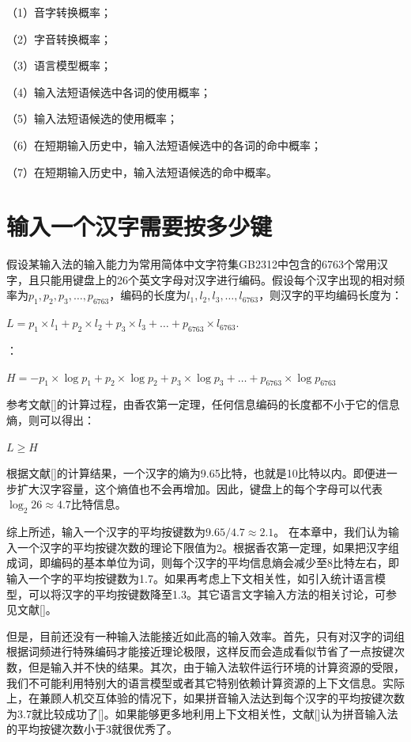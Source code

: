 （1）音字转换概率；

（2）字音转换概率；

（3）语言模型概率；

（4）输入法短语候选中各词的使用概率；

（5）输入法短语候选的使用概率；

（6）在短期输入历史中，输入法短语候选中的各词的命中概率；

（7）在短期输入历史中，输入法短语候选的命中概率。

\section{输入一个汉字需要按多少键}

假设某输入法的输入能力为常用简体中文字符集GB2312中包含的6763个常用汉字，且只能用键盘上的26个英文字母对汉字进行编码。假设每个汉字出现的相对频率为$p_1,p_2,p_3,\ldots,p_{6763}$，编码的长度为$l_1,l_2,l_3,\ldots,l_{6763}$，则汉字的平均编码长度为：

$L = p_1 \times l_1 + p_2 \times l_2 + p_3 \times l_3 + \ldots + p_{6763} \times l_{6763}$.

：

$H = -p_1 \times \log p_1 + p_2 \times \log p_2 + p_3 \times \log p_3  + \ldots + p_{6763} \times \log p_{6763}$

参考文献[\cite{wujun:2012}]的计算过程，由香农第一定理，任何信息编码的长度都不小于它的信息熵，则可以得出：

$L \ge H$

根据文献[\cite{feng:1984}]的计算结果，一个汉字的熵为9.65比特，也就是10比特以内。即便进一步扩大汉字容量，这个熵值也不会再增加。因此，键盘上的每个字母可以代表$\log_2 26 \approx 4.7$比特信息。

综上所述，输入一个汉字的平均按键数为$9.65/4.7 \approx 2.1$。
在本章中，我们认为输入一个汉字的平均按键次数的理论下限值为2。根据香农第一定理，如果把汉字组成词，即编码的基本单位为词，则每个汉字的平均信息熵会减少至8比特左右，即输入一个字的平均按键数为1.7。如果再考虑上下文相关性，如引入统计语言模型，可以将汉字的平均按键数降至1.3。其它语言文字输入方法的相关讨论，可参见文献[\cite{Garay-Vitoria:2006}]。

但是，目前还没有一种输入法能接近如此高的输入效率。首先，只有对汉字的词组根据词频进行特殊编码才能接近理论极限，这样反而会造成看似节省了一点按键次数，但是输入并不快的结果。其次，由于输入法软件运行环境的计算资源的受限，我们不可能利用特别大的语言模型或者其它特别依赖计算资源的上下文信息。实际上，在兼顾人机交互体验的情况下，如果拼音输入法达到每个汉字的平均按键次数为3.7就比较成功了[\cite{Cui:1985}]。如果能够更多地利用上下文相关性，文献[\cite{wujun:2012}]认为拼音输入法的平均按键次数小于3就很优秀了。

